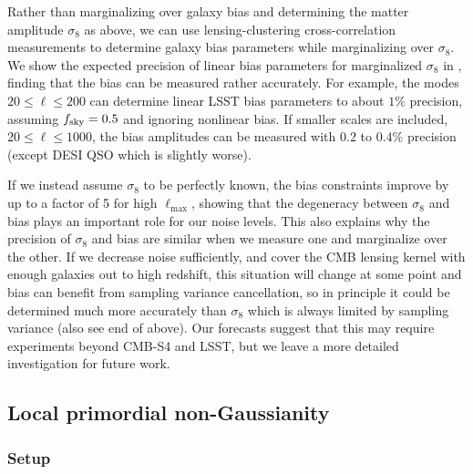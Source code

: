\documentclass[prd,superscriptaddress,floatfix,notitlepage,nofootinbib,reprint]{revtex4-1} %
\begin{document}
Rather than marginalizing over galaxy bias and determining the matter amplitude $\sigma_8$ as above, we can use lensing-clustering cross-correlation measurements to determine galaxy bias parameters while marginalizing over $\sigma_8$.
We show the expected precision of  linear bias parameters for marginalized $\sigma_8$ in , finding that the bias can be measured rather accurately.
For example, the modes $20\le\ell\le 200$ can determine linear LSST bias parameters to about $1\%$ precision,  assuming ${f_\mathrm{sky}}=0.5$ and ignoring nonlinear bias.
If smaller scales are included, $20\le \ell\le 1000$, the bias amplitudes can be measured with $0.2$ to $0.4\%$ precision (except DESI QSO which is slightly worse).

If we instead assume $\sigma_8$ to be perfectly known, the bias constraints improve by up to a factor of 5 for high $\ell_\mathrm{max}$, showing that the degeneracy between $\sigma_8$ and bias plays an important role for our noise levels.
This also explains why the precision of $\sigma_8$ and bias are similar when we measure one and marginalize over the other. 
If we decrease noise sufficiently, and cover the CMB lensing kernel with enough galaxies out to high redshift, this situation will change at some point and bias can benefit from sampling variance cancellation, so in principle it could be determined much more accurately than $\sigma_8$ which is always limited by sampling variance \cite{McDonaldSeljak0810}
(also see end of  above).
Our forecasts suggest that this may require experiments beyond CMB-S4 and LSST, but we leave a more detailed investigation  for future work.





\subsection{Local primordial non-Gaussianity}

\subsubsection{Setup}

\label{se:FnlBiasMarg}
\end{document}
